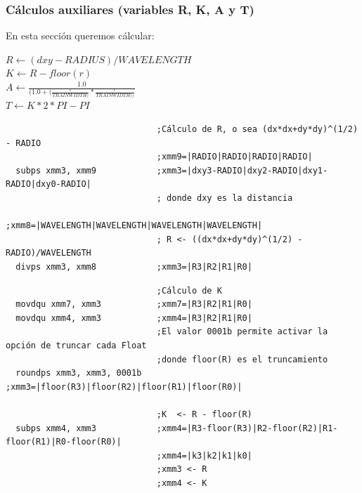 \subsubsection*{Cálculos auxiliares (variables R, K, A y T)}

En esta sección queremos cálcular:

\begin{center}
	$R \gets (dxy-RADIUS)/WAVELENGTH$\\
	$K \gets R-floor(r)$ \\
	$A \gets \frac{1.0}{(1.0+(\frac{r}{TRAINWIDTH)}*\frac{r}{TRAINWIDTH))}}$ \\
	$T \gets K*2*PI-PI$
\end{center}

\begin{codesnippet}
\begin{verbatim}
                              ;Cálculo de R, o sea (dx*dx+dy*dy)^(1/2) - RADIO 
                              ;xmm9=|RADIO|RADIO|RADIO|RADIO|
  subps xmm3, xmm9            ;xmm3=|dxy3-RADIO|dxy2-RADIO|dxy1-RADIO|dxy0-RADIO|
                              ; donde dxy es la distancia
                              ;xmm8=|WAVELENGTH|WAVELENGTH|WAVELENGTH|WAVELENGTH|
                              ; R <- ((dx*dx+dy*dy)^(1/2) - RADIO)/WAVELENGTH
  divps xmm3, xmm8            ;xmm3=|R3|R2|R1|R0|	
\end{verbatim}
\end{codesnippet}
\begin{codesnippet}
\begin{verbatim}
                              ;Cálculo de K
  movdqu xmm7, xmm3           ;xmm7=|R3|R2|R1|R0|
  movdqu xmm4, xmm3           ;xmm4=|R3|R2|R1|R0|
                              ;El valor 0001b permite activar la opción de truncar cada Float
                              ;donde floor(R) es el truncamiento
  roundps xmm3, xmm3, 0001b   ;xmm3=|floor(R3)|floor(R2)|floor(R1)|floor(R0)|

                              ;K  <- R - floor(R)
  subps xmm4, xmm3            ;xmm4=|R3-floor(R3)|R2-floor(R2)|R1-floor(R1)|R0-floor(R0)|								
                              ;xmm4=|k3|k2|k1|k0|
                              ;xmm3 <- R
                              ;xmm4 <- K
\end{verbatim}
\end{codesnippet}

